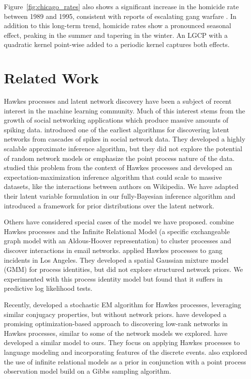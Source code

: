 Figure~\ref{fig:chicago_rates} also shows a significant increase in
the homicide rate between 1989 and 1995, consistent with reports of
escalating gang warfare \citep{Block-1993}. In addition to this
long-term trend, homicide rates show a pronounced seasonal effect,
peaking in the summer and tapering in the winter. An LGCP with a
quadratic kernel point-wise added to a periodic kernel captures both
effects.

\section{Related Work}
Hawkes processes and latent network discovery have been a subject
of recent interest in the machine learning community. Much of this
interest stems from the growth of social networking applications
which produce massive amounts of spiking data. 
\citet{Gomez-2010} introduced one of the earliest algorithms for
discovering latent networks from cascades of spikes in social network
data. They developed a
highly scalable approximate inference algorithm, but they did not
explore the potential of random network models or emphasize the point
process nature of the data.
\citet{Simma-2010} studied this problem from the context of Hawkes
processes and developed an expectation-maximization inference
algorithm that could scale to massive datasets, like the interactions
between authors on Wikipedia.
We have adapted their latent variable formulation in our
fully-Bayesian inference algorithm and introduced a framework for
prior distributions over the latent network.

Others have considered special cases of the model we have
proposed. \citet{Blundell-2012} combine Hawkes processes and the
Infinite Relational Model (a specific exchangeable graph model with an
Aldous-Hoover representation) to cluster processes and discover
interactions in email networks. \citet{Cho-2013} applied Hawkes processes to gang
incidents in Los Angeles. They developed a spatial Gaussian mixture
model (GMM) for process identities, but did not explore structured
network priors. We experimented with this process identity model but
found that it suffers in predictive log likelihood tests.

Recently, \citet{Iwata-2013} developed a stochastic EM algorithm for
Hawkes processes, leveraging similar conjugacy properties, but without
network priors. \citet{Zhou-2013} have developed a promising
optimization-based approach to discovering low-rank networks in Hawkes
processes, similar to some of the network models we explored.
\citet{Guo-2014} have developed a similar model to ours. They focus on
applying Hawkes processes to language modeling and incorporating
features of the discrete events. \citet{Dubois-2013} also explored the
use of infinite relational models as a prior in conjunction with a
point process observation model build on a Gibbs sampling algorithm.



